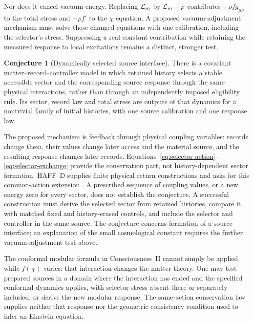 \documentclass[12pt,a4paper]{article}
\theoremstyle{definition}
\newtheorem{conjecture}[theorem]{Conjecture}
\begin{document}
Nor does it cancel vacuum energy. Replacing ${\cal L}_m$ by ${\cal L}_m-\rho$ contributes $-\rho f g_{\mu\nu}$ to the total stress and $-\rho f'$ to the $\chi$ equation.
A proposed vacuum-adjustment mechanism must solve these changed equations with one calibration, including the selector's stress.
Suppressing a real constant contribution while retaining the measured response to local excitations remains a distinct, stronger test.

\begin{conjecture}[Dynamically selected source interface]
\label{conj:dynamic-interface}
There is a covariant matter--record--controller model in which retained history selects a stable accessible sector and the corresponding source response through the same physical interactions, rather than through an independently imposed eligibility rule.
Its sector, record law and total stress are outputs of that dynamics for a nontrivial family of initial histories, with one source calibration and one response law.
\end{conjecture}

The proposed mechanism is feedback through physical coupling variables: records change them, their values change later access and the material source, and the resulting response changes later records.
Equations~\eqref{eq:selector-action}--\eqref{eq:selector-exchange} provide the conservation part, not history-dependent sector formation.
HAFF~D supplies finite physical return constructions and asks for this common-action extension \cite{Liu2026HAFFD}.
A prescribed sequence of coupling values, or a new energy zero for every sector, does not establish the conjecture.
A successful construction must derive the selected sector from retained histories, compare it with matched fixed and history-erased controls, and include the selector and controller in the same source.
The conjecture concerns formation of a source interface; an explanation of the small cosmological constant requires the further vacuum-adjustment test above.

The conformal modular formula in Consciousness~II cannot simply be applied while $f(\chi)$ varies: that interaction changes the matter theory.
One may test prepared sources in a domain where the interaction has ended and the specified conformal dynamics applies, with selector stress absent there or separately included, or derive the new modular response.
The same-action conservation law supplies neither that response nor the geometric consistency condition used to infer an Einstein equation.
\end{document}
